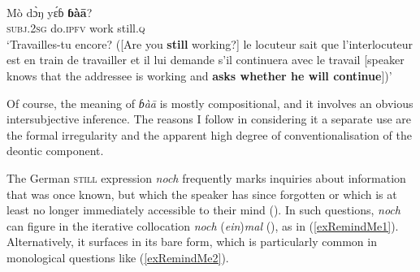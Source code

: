 \begin{exe}
	\ex {}\label{exMundangInterrogative}\\
	\gll Mò dɔ̀ŋ yɛ́ɓ \textbf{ɓàā}?\\
	\textsc{subj}.2\textsc{sg} do.\textsc{\textsc{ipfv}} work still.\textsc{q}\\
	\glt \lq Travailles-tu encore? ([Are you \textbf{still} working?] le locuteur sait que l’interlocuteur est en train de travailler et il lui demande s’il continuera avec le travail [speaker knows that the addressee is working and \textbf{asks whether he will continue}])' \parencite[485]{Elders2000}
\end{exe}

Of course, the meaning of  \textit{ɓàā} is mostly compositional, and it involves an obvious intersubjective inference. The reasons I follow \textcite[484–285]{Elders2000} in considering it a separate use are the formal irregularity and the apparent high degree of conventionalisation of the deontic component.

The German \textsc{still} expression \textit{noch} frequently marks inquiries about information that was once known, but which the speaker has since forgotten or which is at least no longer immediately accessible to their mind (). In such questions, \textit{noch} can figure in the iterative collocation \textit{noch} (\textit{ein})\textit{mal} (), as in (\ref{exRemindMe1}). Alternatively, it surfaces in its bare form, which is particularly common in monological questions like (\ref{exRemindMe2}).

